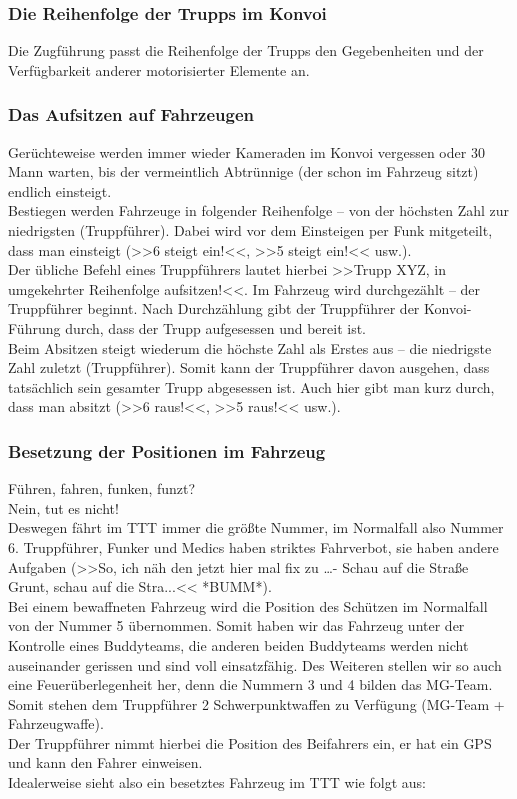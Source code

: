 \subsubsection{Die Reihenfolge der Trupps im Konvoi}
	Die Zugführung passt die Reihenfolge der Trupps den Gegebenheiten und der Verfügbarkeit anderer motorisierter Elemente an.

\subsubsection{Das Aufsitzen auf Fahrzeugen}
	Gerüchteweise werden immer wieder Kameraden im Konvoi vergessen oder 30 Mann warten, bis der vermeintlich Abtrünnige (der schon im Fahrzeug sitzt) endlich einsteigt. \\
	Bestiegen werden Fahrzeuge in folgender Reihenfolge – von der höchsten Zahl zur niedrigsten (Truppführer). Dabei wird vor dem Einsteigen per Funk mitgeteilt, dass man einsteigt (>>6 steigt ein!<<, >>5 steigt ein!<< usw.). \\
	Der übliche Befehl eines Truppführers lautet hierbei >>Trupp XYZ, in umgekehrter Reihenfolge aufsitzen!<<.
Im Fahrzeug wird durchgezählt – der Truppführer beginnt. Nach Durchzählung gibt der Truppführer der Konvoi-Führung durch, dass der Trupp aufgesessen und bereit ist. \\
	Beim Absitzen steigt wiederum die höchste Zahl als Erstes aus – die niedrigste Zahl zuletzt (Truppführer). Somit kann der Truppführer davon ausgehen, dass tatsächlich sein gesamter Trupp abgesessen ist. Auch hier gibt man kurz durch, dass man absitzt (>>6 raus!<<, >>5 raus!<< usw.). \\

\subsubsection{Besetzung der Positionen im Fahrzeug}
	Führen, fahren, funken, funzt? \\
	Nein, tut es nicht! \\
	Deswegen fährt im TTT immer die größte Nummer, im Normalfall also Nummer 6. Truppführer, Funker und Medics haben striktes  Fahrverbot, sie haben andere Aufgaben (>>So, ich näh den jetzt hier mal fix zu …- Schau auf die Straße Grunt, schau auf die Stra...<< *BUMM*). \\
	Bei einem bewaffneten Fahrzeug wird die Position des Schützen im Normalfall von der Nummer 5 übernommen. Somit haben wir das Fahrzeug unter der Kontrolle eines Buddyteams, die anderen beiden Buddyteams werden nicht auseinander gerissen und sind voll einsatzfähig. Des Weiteren stellen wir so auch eine Feuerüberlegenheit her, denn die Nummern 3 und 4 bilden das MG-Team. Somit stehen dem Truppführer 2 Schwerpunktwaffen zu Verfügung (MG-Team + Fahrzeugwaffe). \\
	Der Truppführer nimmt hierbei die Position des Beifahrers ein, er hat ein GPS und kann den Fahrer einweisen. \\
	Idealerweise sieht also ein besetztes Fahrzeug im TTT wie folgt aus:

